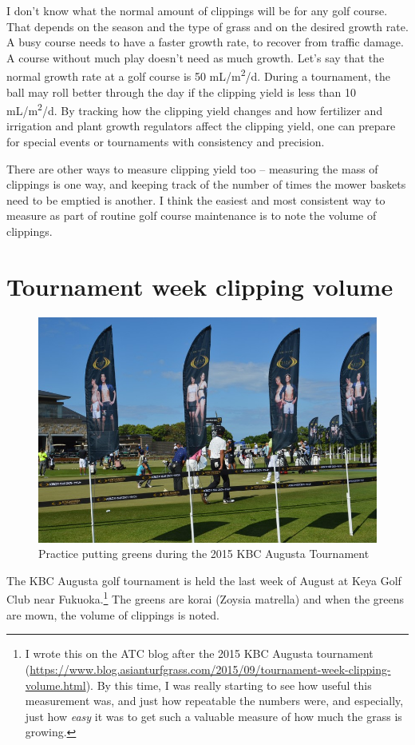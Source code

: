 \documentclass[12pt,b5,]{tufte-book}
\begin{document}
I don't know what the normal amount of clippings will be for any golf course. That depends on the season and the type of grass and on the desired growth rate. A busy course needs to have a faster growth rate, to recover from traffic damage. A course without much play doesn't need as much growth. Let's say that the normal growth rate at a golf course is 50 mL/m\textsuperscript{2}/d. During a tournament, the ball may roll better through the day if the clipping yield is less than 10 mL/m\textsuperscript{2}/d. By tracking how the clipping yield changes and how fertilizer and irrigation and plant growth regulators affect the clipping yield, one can prepare for special events or tournaments with consistency and precision.

There are other ways to measure clipping yield too -- measuring the mass of clippings is one way, and keeping track of the number of times the mower baskets need to be emptied is another. I think the easiest and most consistent way to measure as part of routine golf course maintenance is to note the volume of clippings.

\hypertarget{tournament-week-clipping-volume}{%
\chapter{Tournament week clipping volume}\label{tournament-week-clipping-volume}}

\begin{figure}
\centering
\includegraphics{img/b4-1.jpg}
\caption{Practice putting greens during the 2015 KBC Augusta Tournament}
\end{figure}

The KBC Augusta golf tournament is held the last week of August at Keya Golf Club near Fukuoka.\footnote{I wrote this on the ATC blog after the 2015 KBC Augusta tournament (\url{https://www.blog.asianturfgrass.com/2015/09/tournament-week-clipping-volume.html}). By this time, I was really starting to see how useful this measurement was, and just how repeatable the numbers were, and especially, just how \emph{easy} it was to get such a valuable measure of how much the grass is growing.} The greens are korai (Zoysia matrella) and when the greens are mown, the volume of clippings is noted.
\end{document}
